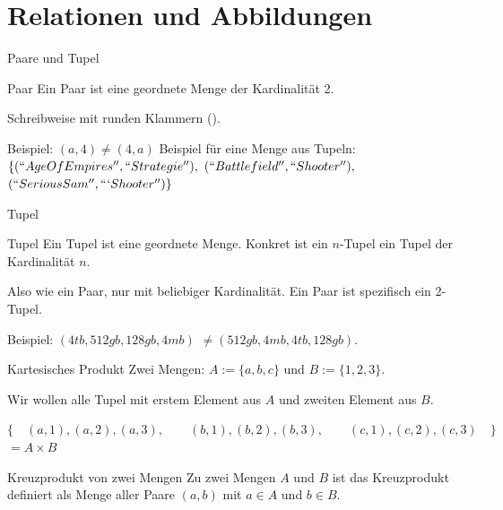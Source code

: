 \section{Relationen und Abbildungen}
\begin{frame}{Paare und Tupel}
	\pause
	\begin{block}{Paar}
		Ein Paar ist eine geordnete Menge \pause der Kardinalität 2.
	\end{block}
	\pause
	Schreibweise mit runden Klammern ().
	\begin{itemize}
		\pitem Beispiel: $(a, 4)$\pause $\neq (4, a)$
		\pitem Beispiel für eine Menge aus Tupeln: $\{(``Age Of Empires'', ``Strategie''),$ $(``Battlefield'', ``Shooter''),$ $(``Serious Sam'', ```Shooter'')\}$
	\end{itemize}
\end{frame}

\begin{frame}{Tupel}
	\pause
	\begin{block}{Tupel}
		Ein Tupel ist eine geordnete Menge. \pause Konkret ist ein $n$-Tupel ein Tupel der Kardinalität $n$.
	\end{block}
	\pause
	Also wie ein Paar, nur mit beliebiger Kardinalität. \pause Ein Paar ist spezifisch ein 2-Tupel.\pause
	
	Beispiel: $(4tb, 512gb, 128gb, 4mb)$ \pause $\neq (512gb, 4mb, 4tb, 128gb)$.
\end{frame}

\begin{frame}{Kartesisches Produkt}
	Zwei Mengen: $A := \{a, b, c\}$ \pause und $B := \{1, 2, 3\}$. \pause
	
	Wir wollen alle Tupel \pause mit erstem Element aus $A$ \pause und zweiten Element aus $B$.\pause
	
	$\{
	\quad (a, 1), (a, 2), (a, 3), 
	\qquad (b, 1), (b, 2), (b, 3), 
	\qquad (c, 1), (c, 2), (c, 3)\quad
	\}$ \pause $ = A \times B$
	
	\pause
	
	\begin{block}{Kreuzprodukt von zwei Mengen}
		Zu zwei Mengen $A$ und $B$ ist das Kreuzprodukt definiert als Menge aller Paare $(a, b)$ mit $a \in A$ und $b \in B$.
	\end{block}
\end{frame}

